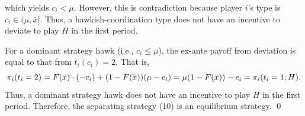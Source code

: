 \documentclass[12pt,english]{article}
\begin{document}
which yields $c_i <\mu$. However, this is contradiction because player $i$'s type is $c_i \in (\mu, \bar{x}]$. Thus, a hawkish-coordination type does not have an incentive to deviate to play $H$ in the first period.\par
For a dominant strategy hawk (i.e., $c_i \leq \mu$), the ex-ante payoff from deviation is equal to that from $t_i(c_i)=2$. That is, 
\begin{equation}
\pi_i(t_i=2)=F(\bar{x})\cdot (-c_i)+(1-F(\bar{x})) (\mu-c_i)=\mu(1-F(\bar{x}))-c_i=\pi_i(t_i=1;H). \notag
\end{equation}
Thus, a dominant strategy hawk does not have an incentive to play $H$ in the first period. Therefore, the separating strategy (10) is an equilibrium strategy. \qed \par









\setlength\bibsep{0pt}











\end{document}
